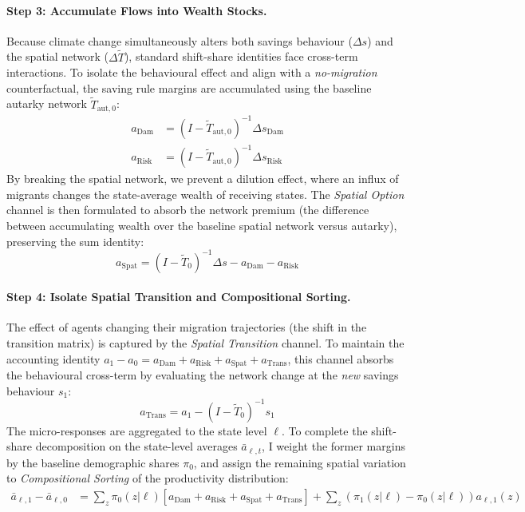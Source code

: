 \documentclass[12pt, a4paper]{article}
\begin{document}
\paragraph{Step 3: Accumulate Flows into Wealth Stocks.}
Because climate change simultaneously alters both savings behaviour ($\Delta s$) and the spatial network ($\Delta \tilde{T}$), standard shift-share identities face cross-term interactions. To isolate the behavioural effect and align with a \textit{no-migration} counterfactual, the saving rule margins are accumulated using the baseline autarky network $\tilde{T}_{\text{aut}, 0}$:
\begin{align}
    a_{\text{Dam}} &= (I - \tilde{T}_{\text{aut}, 0})^{-1} \Delta s_{\text{Dam}} \\
    a_{\text{Risk}} &= (I - \tilde{T}_{\text{aut}, 0})^{-1} \Delta s_{\text{Risk}}
\end{align}
By breaking the spatial network, we prevent a dilution  effect, where an influx of migrants changes the state-average wealth of receiving states. The \textit{Spatial Option} channel is then formulated to absorb the network premium (the difference between accumulating wealth over the baseline spatial network versus autarky), preserving the sum identity:
\begin{equation}
    a_{\text{Spat}} = (I - \tilde{T}_0)^{-1} \Delta s - a_{\text{Dam}} - a_{\text{Risk}}
\end{equation}

\paragraph{Step 4: Isolate Spatial Transition and Compositional Sorting.}
The effect of agents changing their migration trajectories (the shift in the transition matrix) is captured by the \textit{Spatial Transition} channel. To maintain the accounting identity $a_1 - a_0 = a_{\text{Dam}} + a_{\text{Risk}} + a_{\text{Spat}} + a_{\text{Trans}}$, this channel absorbs the behavioural cross-term by evaluating the network change at the \textit{new} savings behaviour $s_1$:
\begin{equation}
    a_{\text{Trans}} = a_1 - (I - \tilde{T}_0)^{-1} s_1
\end{equation}
The micro-responses are aggregated to the state level $\ell$. To complete the shift-share decomposition on the state-level averages $\bar{a}_{\ell,t}$, I weight the former margins by the baseline demographic shares $\pi_0$, and assign the remaining spatial variation to \textit{Compositional Sorting} of the productivity distribution:
\begin{align}
    \bar{a}_{\ell,1} - \bar{a}_{\ell,0} &= \sum_{z} \pi_0(z|\ell) \left[ a_{\text{Dam}} + a_{\text{Risk}} + a_{\text{Spat}} + a_{\text{Trans}} \right] + \sum_{z} \left( \pi_1(z|\ell) - \pi_0(z|\ell) \right) a_{\ell,1}(z)
\end{align}
\end{document}
